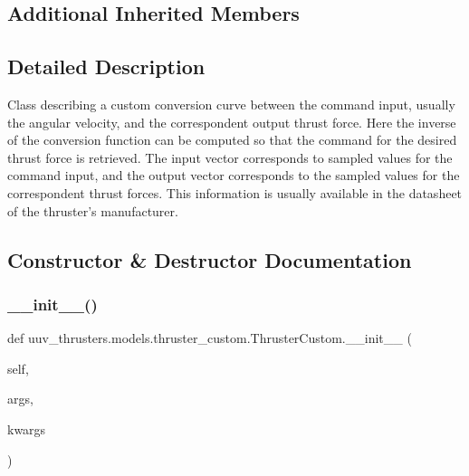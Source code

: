 \subsection*{Additional Inherited Members}


\subsection{Detailed Description}
\begin{DoxyVerb}Class describing a custom conversion curve between the command input,
usually the angular velocity, and the correspondent output thrust force.
Here the inverse of the conversion function can be computed so that the
command for the desired thrust force is retrieved.
The input vector corresponds to sampled values for the command input, and
the output vector corresponds to the sampled values for the correspondent
thrust forces.
This information is usually available in the datasheet of the thruster's
manufacturer.
\end{DoxyVerb}
 

\subsection{Constructor \& Destructor Documentation}
\mbox{\label{classuuv__thrusters_1_1models_1_1thruster__custom_1_1ThrusterCustom_aa4ee50899f9ded03b016ec8536e5923e}} 
\subsubsection{\texorpdfstring{\+\_\+\+\_\+init\+\_\+\+\_\+()}{\_\_init\_\_()}}
{\footnotesize\ttfamily def uuv\+\_\+thrusters.\+models.\+thruster\+\_\+custom.\+Thruster\+Custom.\+\_\+\+\_\+init\+\_\+\+\_\+ (\begin{DoxyParamCaption}\item[{}]{self,  }\item[{}]{args,  }\item[{}]{kwargs }\end{DoxyParamCaption})}


